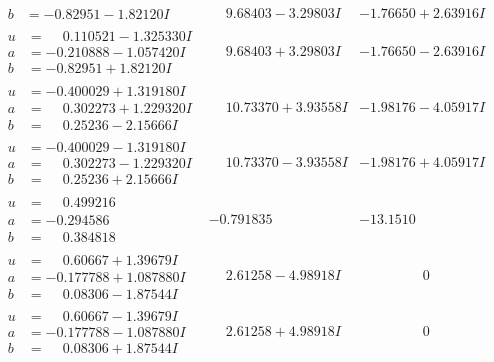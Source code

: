 \documentclass[1p]{elsarticle_modified}
\theoremstyle{definition}
\begin{document}
$$\begin{array}{c|c|c}
\begin{aligned}
b &= -0.82951 - 1.82120 I\end{aligned}
 & \phantom{-}9.68403 - 3.29803 I & -1.76650 + 2.63916 I \\ \hline\begin{aligned}
u &= \phantom{-}0.110521 - 1.325330 I \\
a &= -0.210888 - 1.057420 I \\
b &= -0.82951 + 1.82120 I\end{aligned}
 & \phantom{-}9.68403 + 3.29803 I & -1.76650 - 2.63916 I \\ \hline\begin{aligned}
u &= -0.400029 + 1.319180 I \\
a &= \phantom{-}0.302273 + 1.229320 I \\
b &= \phantom{-}0.25236 - 2.15666 I\end{aligned}
 & \phantom{-}10.73370 + 3.93558 I & -1.98176 - 4.05917 I \\ \hline\begin{aligned}
u &= -0.400029 - 1.319180 I \\
a &= \phantom{-}0.302273 - 1.229320 I \\
b &= \phantom{-}0.25236 + 2.15666 I\end{aligned}
 & \phantom{-}10.73370 - 3.93558 I & -1.98176 + 4.05917 I \\ \hline\begin{aligned}
u &= \phantom{-}0.499216\phantom{ +0.000000I} \\
a &= -0.294586\phantom{ +0.000000I} \\
b &= \phantom{-}0.384818\phantom{ +0.000000I}\end{aligned}
 & -0.791835\phantom{ +0.000000I} & -13.1510\phantom{ +0.000000I} \\ \hline\begin{aligned}
u &= \phantom{-}0.60667 + 1.39679 I \\
a &= -0.177788 + 1.087880 I \\
b &= \phantom{-}0.08306 - 1.87544 I\end{aligned}
 & \phantom{-}2.61258 - 4.98918 I & \phantom{-0.000000 } 0 \\ \hline\begin{aligned}
u &= \phantom{-}0.60667 - 1.39679 I \\
a &= -0.177788 - 1.087880 I \\
b &= \phantom{-}0.08306 + 1.87544 I\end{aligned}
 & \phantom{-}2.61258 + 4.98918 I & \phantom{-0.000000 } 0 \\ \hline\begin{aligned}

\end{aligned}
\end{array}$$
\end{document}
